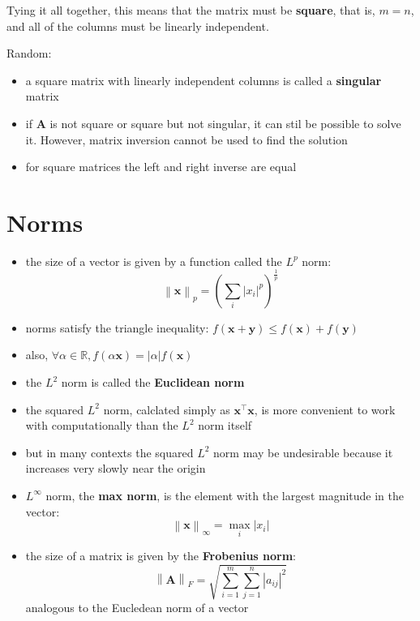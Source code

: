 \documentclass[11pt,twocolumn]{report}
\def\realnumbers{\mathbb{R}}
\newcommand{\norm}[1]{\left\lVert#1\right\rVert}
\begin{document}
Tying it all together, this means that the matrix must be \textbf{square}, that
is, $m=n$, and all of the columns must be linearly independent.

Random:
\begin{itemize}
  \item a square matrix with linearly independent columns is called a
    \textbf{singular} matrix 
  \item if $\bm{A}$ is not square or square but not singular, it can stil be
    possible to solve it.  However, matrix inversion cannot be used to find the
    solution
  \item for square matrices the left and right inverse are equal
\end{itemize}

\section{Norms}
\begin{itemize}
  \item the size of a vector is given by a function called the $L^p$ norm:
    \begin{equation}
      \norm{\bm{x}}_p = (\sum_i {\lvert x_i \rvert}^p)^{\frac{1}{p}}
    \end{equation}
  \item norms satisfy the triangle inequality: $f(\bm{x} + \bm{y}) \leq
    f(\bm{x}) + f(\bm{y})$
  \item also, $\forall \alpha \in \realnumbers, f(\alpha\bm{x}) =
    |\alpha|f(\bm{x})$
  \item the $L^2$ norm is called the \textbf{Euclidean norm}
  \item the squared $L^2$ norm, calclated simply as $\bm{x}^\intercal\bm{x}$, is
    more convenient to work with computationally than the $L^2$ norm itself
  \item but in many contexts the squared $L^2$ norm may be undesirable because
    it increases very slowly near the origin
  \item $L^\infty$ norm, the \textbf{max norm}, is the element with the largest
    magnitude in the vector:
    \begin{equation}
      \norm{\bm{x}}_\infty = \max_i |x_i|
    \end{equation}
  \item the size of a matrix is given by the \textbf{Frobenius norm}:
    \begin{equation}
      \norm{\bm{A}}_F = \sqrt{\sum_{i=1}^m\sum_{j=1}^n|a_{ij}|^2}
    \end{equation}
    analogous to the Eucledean norm of a vector
\end{itemize}
\end{document}
